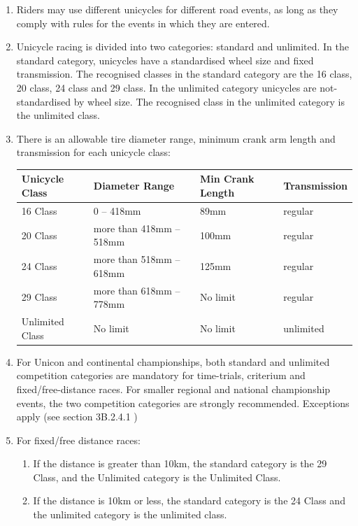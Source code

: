 \begin{enumerate}[leftmargin=1.5em,labelsep=*]
	\item Riders may use different unicycles for different road events, as long as they comply with rules for the events in which they are entered.
	\item Unicycle racing is divided into two categories: standard and unlimited.
	In the standard category, unicycles have a standardised wheel size and fixed transmission.
	The recognised classes in the standard category are the 16 class, 20 class, 24 class and 29 class.
	In the unlimited category unicycles are not-standardised by wheel size.
	The recognised class in the unlimited category is the unlimited class.
	\item There is an allowable tire diameter range, minimum crank arm length and transmission for each unicycle class:
	\begin{longtable}{|p{2.8cm}|p{4.6cm}|p{3.6cm}|p{2.5cm}|}
		\hline
		\textbf{Unicycle Class} & \textbf{Diameter Range} & \textbf{Min Crank Length} & \textbf{Transmission}\\
		\hline
		16 Class & 0 -- 418mm & 89mm & regular \\
		\hline
		20 Class & more than 418mm -- 518mm & 100mm & regular \\
		\hline
		24 Class & more than 518mm -- 618mm & 125mm & regular \\
		\hline
		29 Class & more than 618mm -- 778mm & No limit & regular \\
		\hline
		Unlimited Class & No limit & No limit & unlimited \\
		\hline
	\end{longtable}
	\item For Unicon and continental championships, both standard and unlimited competition categories are mandatory for time-trials, criterium and fixed/free-distance races. 
    For smaller regional and national championship events, the two competition categories are strongly recommended.  Exceptions apply (see section 3B.2.4.1 )
	\item For fixed/free distance races:
	\begin{enumerate}[label*=\arabic*,leftmargin=1.5em,labelsep=*]
		\item If the distance is greater than 10km, the standard category is the 29 Class, and the Unlimited category is the Unlimited Class.
		\item If the distance is 10km or less, the standard category is the 24 Class and the unlimited category is the unlimited class.

\end{enumerate}
\end{enumerate}
